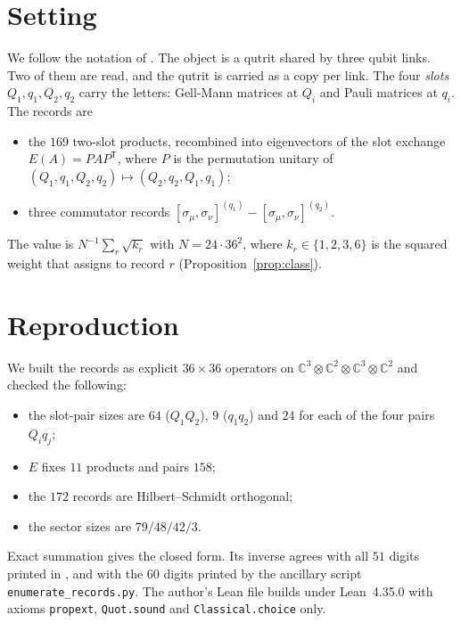 \documentclass[11pt]{article}
\newcommand{\ident}[1]{\nolinkurl{#1}}
\theoremstyle{remark}
\begin{document}
\section{Setting}
We follow the notation of \cite{wg}. The object is a qutrit shared by three qubit links. Two of them are read, and the qutrit is carried as a copy per link. The four \emph{slots} $Q_1,q_1,Q_2,q_2$ carry the letters: Gell-Mann matrices at $Q_i$ and Pauli matrices at $q_i$. The records are
\begin{itemize}
\item the $169$ two-slot products, recombined into eigenvectors of the slot exchange $E(A)=PAP^{\mathsf T}$, where $P$ is the permutation unitary of $(Q_1,q_1,Q_2,q_2)\mapsto(Q_2,q_2,Q_1,q_1)$;
\item three commutator records $[\sigma_\mu,\sigma_\nu]^{(q_1)}-[\sigma_\mu,\sigma_\nu]^{(q_2)}$.
\end{itemize}
The value is $N^{-1}\sum_r\sqrt{k_r}$ with $N=24\cdot36^2$, where $k_r\in\{1,2,3,6\}$ is the squared weight that \cite[Eq.~(5)]{wg} assigns to record $r$ (Proposition~\ref{prop:class}).

\section{Reproduction}
We built the records as explicit $36\times36$ operators on $\mathbb C^3\otimes\mathbb C^2\otimes\mathbb C^3\otimes\mathbb C^2$ and checked the following:
\begin{itemize}
\item the slot-pair sizes are $64$ ($Q_1Q_2$), $9$ ($q_1q_2$) and $24$ for each of the four pairs $Q_iq_j$;
\item $E$ fixes $11$ products and pairs $158$;
\item the $172$ records are Hilbert--Schmidt orthogonal;
\item the sector sizes are $79/48/42/3$.
\end{itemize}
Exact summation gives the closed form. Its inverse agrees with all $51$ digits printed in \cite[Sec.~S7]{wg}, and with the $60$ digits printed by the ancillary script \ident{enumerate_records.py}. The author's Lean file builds under Lean~4.35.0 with axioms \texttt{propext}, \texttt{Quot.sound} and \ident{Classical.choice} only.
\end{document}
